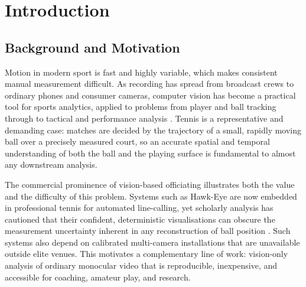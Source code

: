 \chapter{Introduction}
\label{ch:introduction}

\section{Background and Motivation}
\label{sec:intro-background}

Motion in modern sport is fast and highly variable, which makes consistent
manual measurement difficult. As recording has spread from broadcast crews to
ordinary phones and consumer cameras, computer vision has become a
practical tool for sports analytics, applied to problems from player and ball
tracking through to tactical and performance analysis
\cite{thomas2017cvsports}. Tennis is a representative and demanding case:
matches are decided by the trajectory of a small, rapidly moving ball over a
precisely measured court, so an accurate spatial and temporal understanding of
both the ball and the playing surface is fundamental to almost any downstream
analysis.

The commercial prominence of vision-based officiating illustrates both the
value and the difficulty of this problem. Systems such as Hawk-Eye are now
embedded in professional tennis for automated line-calling, yet scholarly
analysis has cautioned that their confident, deterministic visualisations can
obscure the measurement uncertainty inherent in any reconstruction of ball
position \cite{collins2008hawkeye}. Such systems also depend on calibrated
multi-camera installations that are unavailable outside elite venues. This
motivates a complementary line of work: vision-only analysis of ordinary
monocular video that is reproducible, inexpensive, and accessible for coaching,
amateur play, and research.

